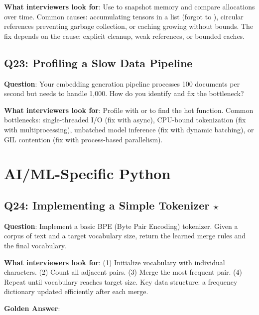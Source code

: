 \textbf{What interviewers look for}: Use  to snapshot memory and compare allocations over time. Common causes: accumulating tensors in a list (forgot to ), circular references preventing garbage collection, or caching growing without bounds. The fix depends on the cause: explicit cleanup, weak references, or bounded caches.

\subsection{Q23: Profiling a Slow Data Pipeline}

\textbf{Question}: Your embedding generation pipeline processes 100 documents per second but needs to handle 1,000. How do you identify and fix the bottleneck?

\textbf{What interviewers look for}: Profile with  or  to find the hot function. Common bottlenecks: single-threaded I/O (fix with async), CPU-bound tokenization (fix with multiprocessing), unbatched model inference (fix with dynamic batching), or GIL contention (fix with process-based parallelism).


\section{AI/ML-Specific Python}

\subsection{Q24: Implementing a Simple Tokenizer $\star$}

\textbf{Question}: Implement a basic BPE (Byte Pair Encoding) tokenizer. Given a corpus of text and a target vocabulary size, return the learned merge rules and the final vocabulary.

\textbf{What interviewers look for}: (1) Initialize vocabulary with individual characters. (2) Count all adjacent pairs. (3) Merge the most frequent pair. (4) Repeat until vocabulary reaches target size. Key data structure: a frequency dictionary updated efficiently after each merge.

\textbf{Golden Answer}:

